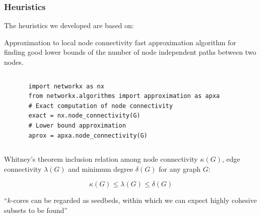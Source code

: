 \documentclass[ignorenonframetext,red,8pt,notes=hide]{beamer}
\begin{document}
\begin{frame}[fragile]
\frametitle{Heuristics}

The heuristics we developed are based on:

\begin{block}{Approximation to local node connectivity}
\citet{white:2001b} fast approximation algorithm for finding good lower bounds of the number of node independent paths between two nodes.

\begin{columns}[c]
\begin{column}{0.1\textwidth}

\end{column}

\begin{column}{0.8\textwidth}
\begin{scriptsize}
\begin{lstlisting}
import networkx as nx
from networkx.algorithms import approximation as apxa
# Exact computation of node connectivity
exact = nx.node_connectivity(G)
# Lower bound approximation
aprox = apxa.node_connectivity(G)
\end{lstlisting}
\end{scriptsize}
\end{column}

\begin{column}{0.1\textwidth}

\end{column}
\end{columns}
\end{block}

\begin{block}{Whitney's theorem}
inclusion relation among node connectivity $\kappa(G)$, edge connectivity $\lambda(G)$ and minimum degree $\delta(G)$ for any graph $G$:

\begin{equation*}
\kappa(G) \le \lambda(G) \le \delta(G)
\end{equation*}

``$k$-cores can be regarded as seedbeds, within which we can expect highly cohesive subsets to be found'' \citet[281]{seidman:1983}
\end{block}
\end{frame}
\end{document}
